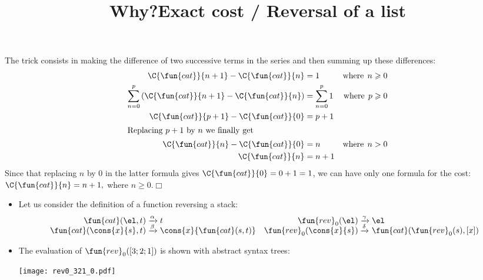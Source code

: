 \documentclass[wide]{slides}
\begin{document}
\begin{slide}
  \title{Why?}

  The trick consists in making the difference of two successive terms
  in the series and then summing up these differences:
\begin{align*}
\C{\fun{cat}}{n+1} - \C{\fun{cat}}{n} &= 1 & \text{where} \;\, n
\geqslant 0\\
\sum_{n=0}^{p}{(\C{\fun{cat}}{n+1} - \C{\fun{cat}}{n})} &=
\sum_{n=0}^{p}{1} & \text{where} \;\, p \geqslant 0\\
\C{\fun{cat}}{p+1} - \C{\fun{cat}}{0} &= p + 1\\
\intertext{Replacing \(p+1\) by \(n\) we finally get}
\C{\fun{cat}}{n} - \C{\fun{cat}}{0} &= n & \text{where}\;\, n > 0\\
\C{\fun{cat}}{n}  &= n + 1
\end{align*}
Since that replacing \(n\) by \(0\) in the latter formula gives
\(\C{\fun{cat}}{0} = 0 + 1 = 1\), we can have only one formula for the
cost: \(\C{\fun{cat}}{n} = n + 1,\) where \(n \geqslant 0.\)\hfill\(\Box\)

\end{slide}

\begin{slide}
  \title{Exact cost / Reversal of a list}

  \begin{itemize}

    \item Let us consider the definition of a function 
      reversing a stack:
      \begin{equation*}
        \begin{array}{@{}r@{\;}l@{\;}lr@{\;}l@{\;}l@{}}
          \fun{cat}(\el,t)
          & \xrightarrow{\alpha} & t
          & \fun{rev}_0(\el)
          & \xrightarrow{\smash{\gamma}} & \el\\
          \fun{cat}(\cons{x}{s},t)
          & \xrightarrow{\smash{\beta}} & \cons{x}{\fun{cat}(s,t)}
          & \fun{rev}_0(\cons{x}{s})
          & \xrightarrow{\smash{\delta}} & \fun{cat}(\fun{rev}_0(s),[x])
        \end{array}
      \end{equation*}

      \item The evaluation of \(\fun{rev}_0([3;2;1])\) is shown with
        abstract syntax trees:
        \begin{center}
          \texttt{[image: rev0\_321\_0.pdf]}
        \end{center}

  \end{itemize}

\end{slide}
\end{document}
